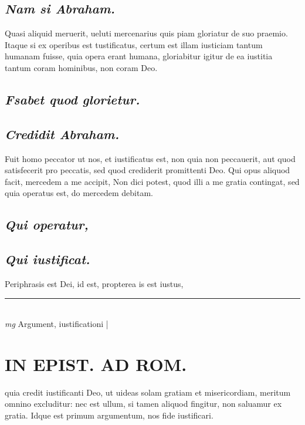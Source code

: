 \documentclass{article}
\begin{document}
\begin{pages}
\subsection*{\textit{Nam si Abraham. }}\pstart Quasi aliquid meruerit, ueluti mercenarius quis piam gloriatur de suo praemio. Itaque si ex operibus est tustificatus, certum est illam iusticiam tantum humanam fuisse, quia opera erant humana, gloriabitur igitur de ea iustitia tantum coram hominibus, non coram Deo.   \pend
{}
{}
\subsection*{\textit{Fsabet quod glorietur. }}
{}
\subsection*{\textit{Credidit Abraham. }}\pstart Fuit homo peccator ut nos, et iustificatus est, non quia non peccauerit, aut quod satisfecerit pro peccatis, sed quod crediderit promittenti Deo.   \pend\pstart Qui opus aliquod facit, mercedem a me accipit, Non dici potest, quod illi a me gratia contingat, sed quia operatus est, do mercedem debitam.   \pend
{}
{}
\subsection*{\textit{Qui operatur, }}
{}
\subsection*{\textit{Qui iustificat. }}\pstart Periphrasis est Dei, id est, propterea is est iustus,  \pend
\vspace{0.5cm}\noindent
\vspace{0.2cm}\rule{1cm}{0.2pt}\\ 
\hspace{0.2cm}\textit{mg}
\footnotesize Argument, iustificationi 
\normalsize| 
\section*{IN EPIST. AD ROM.  }
\marginpar{[ p.39 ]}\pstart quia credit iustificanti Deo, ut uideas solam gratiam et misericordiam, meritum omnino excluditur: nec est ullum, si tamen aliquod fingitur, non saluamur ex gratia. Idque est primum argumentum, nos fide iustificari.  \pend
{}
{}

\end{pages}
\end{document}
